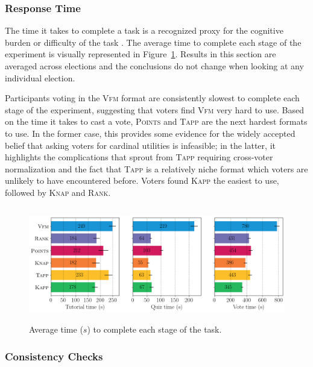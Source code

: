 \documentclass[mnsc,blindrev]{informs3_freeuse} %
\newcommand{\kibitz}[2]{\ifnum\Comments=1{\color{#1}{#2}}\fi}
\newcommand{\gb}[1]{\kibitz{red}{[GB:#1]}}
\newcommand{\points}{\textsc{Points}}
\renewcommand{\rank}{\textsc{Rank}}
\newcommand{\vfm}{\textsc{Vfm}}
\newcommand{\knap}{\textsc{Knap}}
\newcommand{\kapp}{\textsc{Kapp}}
\newcommand{\tapp}{\textsc{Tapp}}
\begin{document}
\subsubsection{Response Time}
The time it takes to complete a task is a recognized  proxy for  the cognitive burden  or difficulty of the task  \citep{rauterberg1992method}.  
%
The average time to complete each stage of the experiment is visually represented in  Figure~\ref{fig:time}.  Results in this section are averaged across elections and the conclusions do not change when looking at any individual election. %

Participants voting in  the \vfm{}   format are consistently slowest to complete each stage of the experiment, suggesting that voters find \vfm{}  very hard to use. Based on the time it takes to cast a vote,  \points{} and \tapp{} are the next hardest formats to use. In the former case, this provides some evidence for the widely accepted belief  that asking voters for cardinal utilities is infeasible; in the latter, it  highlights the complications that sprout from  \tapp{} requiring cross-voter normalization and the fact that  \tapp{} is a relatively niche format which voters are unlikely to have encountered before.  
Voters found \kapp{} the easiest to use, followed by \knap{} and \rank{}.

\begin{figure}[t]
\begin{center}
\includegraphics[width=15cm,height=5cm]{../experiment/time_combined.png}
\caption{Average time ($s$) to complete each stage of the task. 
}\label{fig:time}
\end{center}
\end{figure}

\subsubsection{Consistency Checks}
 
\end{document}
